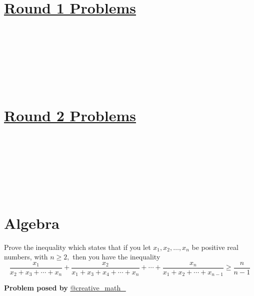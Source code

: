 \documentclass[12pt]{article}
\begin{document}
{\LARGE
\begin{center}
\section*{\huge{\underline{Round 1 Problems}}}
     \\ \vspace{4mm}
     \\ \vspace{4mm}
     \\ \vspace{4mm}
     \\ \vspace{4mm}
     \\ \vspace{4mm}
     \\  \vspace{4mm}
\section*{\huge{\underline{Round 2 Problems}}}
     \\ \vspace{4mm}
     \\ \vspace{4mm}
     \\ \vspace{4mm}
     \\ \vspace{4mm}
     \\ \vspace{4mm}
     \\ \vspace{4mm}
\end{center}
}







\newpage

\section*{Algebra}
 Prove the inequality which states that if you let $x_{1}, x_{2}, \ldots, x_{n}$ be positive real numbers, with $n \geq 2,$ then you have the inequality
$$
\frac{x_{1}}{x_{2}+x_{3}+\cdots+x_{n}}+\frac{x_{2}}{x_{1}+x_{3}+x_{4}+\cdots+x_{n}}+\cdots+\frac{x_{n}}{x_{1}+x_{2}+\cdots+x_{n-1}} \geq \frac{n}{n-1}
$$
\begin{flushright}
\textbf{Problem posed by}
\textcolor{RoyalBlue2}{\href{https://www.instagram.com/creative_math_/}{@creative\_math\_}}
\end{flushright}
\end{document}
